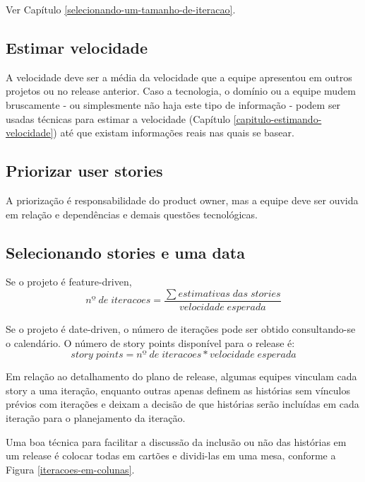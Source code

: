 \documentclass[a4paper,abntfigtabnum,noindentfirst]{abnt}
\begin{document}
Ver Capítulo \ref{selecionando-um-tamanho-de-iteracao}.


\subsection{Estimar velocidade}

A velocidade deve ser a média da velocidade que a equipe apresentou em outros projetos ou no release anterior. Caso a tecnologia, o domínio ou a equipe mudem bruscamente - ou simplesmente não haja este tipo de informação - podem ser usadas técnicas para estimar a velocidade (Capítulo \ref{capitulo-estimando-velocidade}) até que existam informações reais nas quais se basear.


\subsection{Priorizar user stories}

A priorização é responsabilidade do product owner, mas a equipe deve ser ouvida em relação e dependências e demais questões tecnológicas.


\subsection{Selecionando stories e uma data}

Se o projeto é feature-driven,
\begin{equation}
nº\;de\;iteracoes = \frac{\sum estimativas\;das\;stories}{velocidade\;esperada}
\end{equation}

Se o projeto é date-driven, o número de iterações pode ser obtido consultando-se o calendário. O número de story points disponível para o release é:
\begin{equation}
story\;points = nº\;de\;iteracoes * velocidade\;esperada
\end{equation}

Em relação ao detalhamento do plano de release, algumas equipes vinculam cada story a uma iteração, enquanto outras apenas definem as histórias sem vínculos prévios com iterações e deixam a decisão de que histórias serão incluídas em cada iteração para o planejamento da iteração.

Uma boa técnica para facilitar a discussão da inclusão ou não das histórias em um release é colocar todas em cartões e dividi-las em uma mesa, conforme a Figura \ref{iteracoes-em-colunas}.
\end{document}
